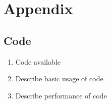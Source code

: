 \section{Appendix}

\subsection{Code}

\begin{enumerate}
    \item Code available
    \item Describe basic usage of code
    \item Describe performance of code
\end{enumerate}